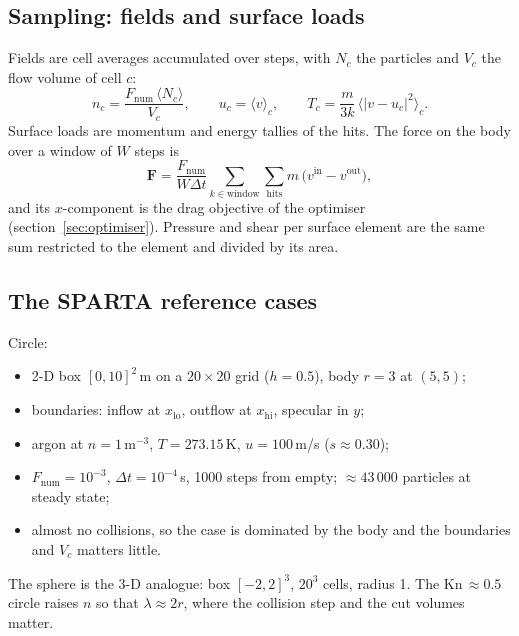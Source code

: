 \documentclass[11pt,a4paper]{article}
\numberwithin{equation}{section}
\begin{document}
\subsection{Sampling: fields and surface loads}
\label{sec:primer-sample}
Fields are cell averages accumulated over steps, with $N_c$ the particles and $V_c$
the flow volume of cell $c$:
\begin{equation}
\label{eq:moments}
n_c = \frac{F_{\mathrm{num}}\,\langle N_c\rangle}{V_c},\qquad
u_c = \langle v\rangle_c,\qquad
T_c = \frac{m}{3k}\,\big\langle |v - u_c|^2\big\rangle_c .
\end{equation}
Surface loads are momentum and energy tallies of the hits.  The force on the body
over a window of $W$ steps is
\begin{equation}
\label{eq:drag-tally}
\mathbf F = \frac{F_{\mathrm{num}}}{W\Delta t}\sum_{k\in\text{window}}\sum_{\text{hits}}
m\,\big(v^{\mathrm{in}} - v^{\mathrm{out}}\big),
\end{equation}
and its $x$-component is the drag objective of the optimiser
(section~\ref{sec:optimiser}).  Pressure and shear per surface element are the same
sum restricted to the element and divided by its area.

\subsection{The SPARTA reference cases}
Circle:
\begin{itemize}
\item 2-D box $[0,10]^2$\,m on a $20\times20$ grid ($h = 0.5$), body $r = 3$ at $(5,5)$;
\item boundaries: inflow at $x_{\mathrm{lo}}$, outflow at $x_{\mathrm{hi}}$, specular
  in $y$;
\item argon at $n = 1\,\mathrm{m^{-3}}$, $T = 273.15$\,K, $u = 100$\,m/s
  ($s\approx 0.30$);
\item $F_{\mathrm{num}} = 10^{-3}$, $\Delta t = 10^{-4}$\,s, 1000 steps from empty;
  $\approx 43\,000$ particles at steady state;
\item almost no collisions, so the case is dominated by the body and the boundaries
  and $V_c$ matters little.
\end{itemize}
The sphere is the 3-D analogue: box $[-2,2]^3$, $20^3$ cells, radius 1.
The Kn\,$\approx 0.5$ circle raises $n$ so that $\lambda\approx 2r$, where the
collision step and the cut volumes matter.
\end{document}
